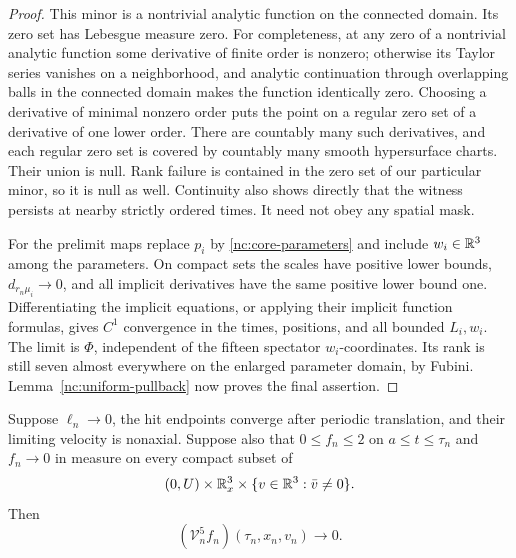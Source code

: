 \begin{proof}
This minor is a nontrivial analytic function on the connected
domain.  Its zero set has Lebesgue measure zero.  For completeness,
at any zero of a nontrivial analytic function some derivative of
finite order is nonzero; otherwise its Taylor series vanishes on
a neighborhood, and analytic continuation through overlapping
balls in the connected domain makes the function identically
zero.  Choosing a derivative of minimal nonzero order puts the
point on a regular zero set of a derivative of one lower order.
There are countably many such derivatives, and each regular zero
set is covered by countably many smooth hypersurface charts.
Their union is null.  Rank failure is contained in the zero set
of our particular minor, so it is null as well.  Continuity also
shows directly that the witness persists at nearby strictly
ordered times.  It need not obey any spatial mask.

For the prelimit maps replace \(p_i\) by
\eqref{nc:core-parameters} and include \(w_i\in\mathbb R^3\) among
the parameters.  On compact sets the scales have positive lower
bounds, \(d_{r_n\mu_i}\to0\), and all implicit derivatives have
the same positive lower bound one.  Differentiating the implicit
equations, or applying their implicit function formulas, gives
\(C^1\) convergence in the times, positions, and all bounded
\(L_i,w_i\).  The limit is \(\Phi\), independent of the fifteen
spectator \(w_i\)-coordinates.  Its rank is still seven almost
everywhere on the enlarged parameter domain, by Fubini.
Lemma~\ref{nc:uniform-pullback} now proves the final assertion.
\end{proof}

\begin{lemma}
\label{nc:five-nonaxial-gains}
Suppose \(\ell_n\to0\), the hit endpoints converge after periodic
translation, and their limiting velocity is nonaxial.  Suppose
also that \(0\le f_n\le2\) on \(a\le t\le\tau_n\) and
\(f_n\to0\) in measure on every compact subset of
\[
 (0,U)\times\mathbb R^3_x
       \times\{v\in\mathbb R^3:\bar v\ne0\}.
\]
Then
\[
 (\mathcal V_n^5f_n)(\tau_n,x_n,v_n)\longrightarrow0.
\]
\end{lemma}


